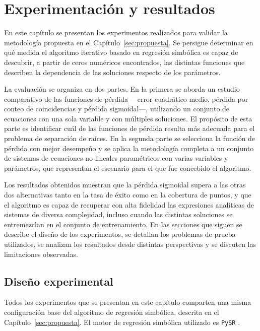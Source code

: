 \chapter{Experimentación y resultados}\label{sec:experimentacion}

En este capítulo se presentan los experimentos realizados para validar la metodología propuesta en el Capítulo~\ref{sec:propuesta}. Se persigue determinar en qué medida el algoritmo iterativo basado en regresión simbólica es capaz de descubrir, a partir de ceros numéricos encontrados, las distintas funciones que describen la dependencia de las soluciones respecto de los parámetros.

La evaluación se organiza en dos partes. En la primera se aborda un estudio comparativo de las funciones de pérdida —error cuadrático medio, pérdida por conteo de coincidencias y pérdida sigmoidal—, utilizando un conjunto de ecuaciones con una sola variable y con múltiples soluciones. El propósito de esta parte es identificar cuál de las funciones de pérdida resulta más adecuada para el problema de separación de raíces. En la segunda parte se selecciona la función de pérdida con mejor desempeño y se aplica la metodología completa a un conjunto de sistemas de ecuaciones no lineales paramétricos con varias variables y parámetros, que representan el escenario para el que fue concebido el algoritmo.

Los resultados obtenidos muestran que la pérdida sigmoidal supera a las otras dos alternativas tanto en la tasa de éxito como en la cobertura de puntos, y que el algoritmo es capaz de recuperar con alta fidelidad las expresiones analíticas de sistemas de diversa complejidad, incluso cuando las distintas soluciones se entremezclan en el conjunto de entrenamiento. En las secciones que siguen se describe el diseño de los experimentos, se detallan los problemas de prueba utilizados, se analizan los resultados desde distintas perspectivas y se discuten las limitaciones observadas.

\section{Diseño experimental} \label{sec:diseno_comun}

Todos los experimentos que se presentan en este capítulo comparten una misma configuración base del algoritmo de regresión simbólica, descrita en el Capítulo~\ref{sec:propuesta}. El motor de regresión simbólica utilizado es \texttt{PySR} \cite{cranmer2023pysr}.

